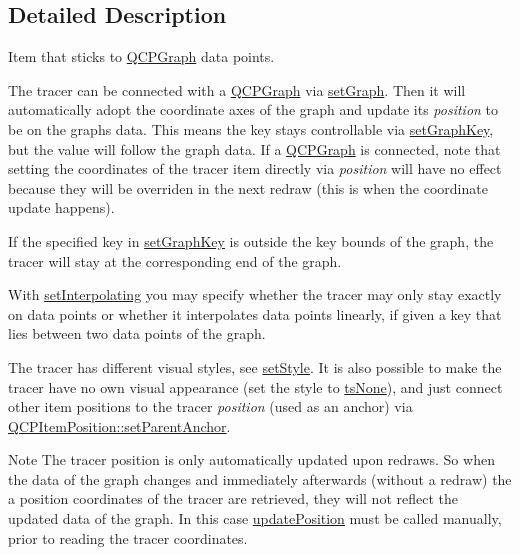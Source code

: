 \subsection{Detailed Description}
Item that sticks to \hyperlink{class_q_c_p_graph}{Q\+C\+P\+Graph} data points. 

 The tracer can be connected with a \hyperlink{class_q_c_p_graph}{Q\+C\+P\+Graph} via \hyperlink{class_q_c_p_item_tracer_af5886f4ded8dd68cb4f3388f390790c0}{set\+Graph}. Then it will automatically adopt the coordinate axes of the graph and update its {\itshape position} to be on the graph\textquotesingle{}s data. This means the key stays controllable via \hyperlink{class_q_c_p_item_tracer_a6840143b42f3b685cedf7c6d83a704c8}{set\+Graph\+Key}, but the value will follow the graph data. If a \hyperlink{class_q_c_p_graph}{Q\+C\+P\+Graph} is connected, note that setting the coordinates of the tracer item directly via {\itshape position} will have no effect because they will be overriden in the next redraw (this is when the coordinate update happens).

If the specified key in \hyperlink{class_q_c_p_item_tracer_a6840143b42f3b685cedf7c6d83a704c8}{set\+Graph\+Key} is outside the key bounds of the graph, the tracer will stay at the corresponding end of the graph.

With \hyperlink{class_q_c_p_item_tracer_a6c244a9d1175bef12b50afafd4f5fcd2}{set\+Interpolating} you may specify whether the tracer may only stay exactly on data points or whether it interpolates data points linearly, if given a key that lies between two data points of the graph.

The tracer has different visual styles, see \hyperlink{class_q_c_p_item_tracer_a41a2ac4f1acd7897b4e2a2579c03204e}{set\+Style}. It is also possible to make the tracer have no own visual appearance (set the style to \hyperlink{class_q_c_p_item_tracer_a2f05ddb13978036f902ca3ab47076500aac27462c79146225bfa8fba24d2ee8a4}{ts\+None}), and just connect other item positions to the tracer {\itshape position} (used as an anchor) via \hyperlink{class_q_c_p_item_position_ac094d67a95d2dceafa0d50b9db3a7e51}{Q\+C\+P\+Item\+Position\+::set\+Parent\+Anchor}.

\begin{DoxyNote}{Note}
The tracer position is only automatically updated upon redraws. So when the data of the graph changes and immediately afterwards (without a redraw) the a position coordinates of the tracer are retrieved, they will not reflect the updated data of the graph. In this case \hyperlink{class_q_c_p_item_tracer_a5b90296109e36384aedbc8908a670413}{update\+Position} must be called manually, prior to reading the tracer coordinates. 
\end{DoxyNote}



